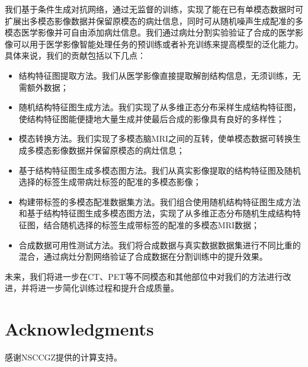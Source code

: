 \documentclass[letterpaper]{article} %
\begin{document}
我们基于条件生成对抗网络，通过无监督的训练，实现了能在已有单模态数据时可扩展出多模态影像数据并保留原模态的病灶信息，同时可从随机噪声生成配准的多模态医学影像并可自由添加病灶信息。我们通过病灶分割实验验证了合成的医学影像可以用于医学影像智能处理任务的预训练或者补充训练来提高模型的泛化能力。具体来说，我们的贡献包括以下几点：
\begin{itemize}
	\item 结构特征图提取方法。我们从医学影像直接提取解剖结构信息，无须训练，无需额外数据；
	\item 随机结构特征图生成方法。我们实现了从多维正态分布采样生成结构特征图，使结构特征图能便捷地大量生成并使最后合成的影像具有良好的多样性；
	\item 模态转换方法。我们实现了多模态脑MRI之间的互转，使单模态数据可转换生成多模态影像数据并保留原模态的病灶信息；
	\item 基于结构特征图生成多模态图方法。我们从真实影像提取的结构特征图及随机选择的标签生成带病灶标签的配准的多模态影像；
	\item 构建带标签的多模态配准数据集方法。我们组合使用随机结构特征图生成方法和基于结构特征图生成多模态图方法，实现了从多维正态分布随机生成结构特征图，结合随机选择的标签生成带标签的配准的多模态MRI数据；
	\item 合成数据可用性测试方法。我们将合成数据与真实数据数据集进行不同比重的混合，通过病灶分割网络验证了合成数据在分割训练中的提升效果。
\end{itemize}

未来，我们将进一步在CT、PET等不同模态和其他部位中对我们的方法进行改进，并将进一步简化训练过程和提升合成质量。	

\section{ Acknowledgments}

感谢NSCCGZ提供的计算支持。




\end{document}
